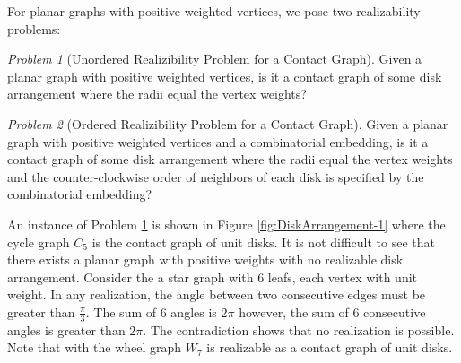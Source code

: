 \documentclass[10pt]{CSUNthesis}
\theoremstyle{plain}%
\theoremstyle{definition}
\theoremstyle{remark}
\newtheorem{prob}{Problem}
\begin{document}
For planar graphs with positive weighted vertices, we pose two realizability problems:
\begin{prob}[Unordered Realizibility Problem for a Contact Graph]\label{problem:UnorderedContactGraph}
Given a planar graph with positive weighted vertices, is it a contact graph of some disk arrangement where the radii equal the vertex weights?
\end{prob}
\begin{prob}[Ordered Realizibility Problem for a Contact Graph]\label{problem:OrderedContactGraph}
Given a planar graph with positive weighted vertices and a combinatorial embedding, is it a contact graph of some disk arrangement where the radii equal the vertex weights and the counter-clockwise order of neighbors of each disk is specified by the combinatorial embedding?
\end{prob}

An instance of Problem \ref{problem:UnorderedContactGraph} is shown in Figure \ref{fig:DiskArrangement-1} where the cycle graph $C_5$ is the contact graph of unit disks.
It is not difficult to see that there exists a planar graph with positive weights with no realizable disk arrangement.
Consider the a star graph with 6 leafs, each vertex with unit weight.
In any realization, the angle between two consecutive edges must be greater than $\frac{\pi}{3}$. 
The sum of 6 angles is $2 \pi$ however, the sum of 6 consecutive angles is greater than $2\pi$.
The contradiction shows that no realization is possible.  
Note that with the wheel graph $W_7$ is realizable as a contact graph of unit disks.
\end{document}
